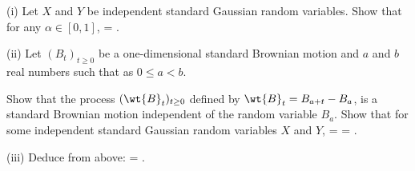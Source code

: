 \begin{problem}
\ben
\item [(i)] Let $X$ and $Y$ be independent standard Gaussian random variables. Show that for any $\alpha \in [0,1]$,
\be
\pro{} = \arcsin\sqrt{\alpha}.
\ee

\item [(ii)] Let $(B_t)_{t\geq 0}$ be a one-dimensional standard Brownian motion and $a$ and $b$ real numbers such that as $0\leq a< b$.

Show that the process $(\wt{B}_t)_{t\geq 0}$ defined by $\wt{B}_t = B_{a+t}-B_a$, is a standard Brownian motion independent of the random variable $B_a$. Show that for some independent standard Gaussian random variables $X$ and $Y$,
\be
\pro{} = \pro{} = \pro{}.
\ee

\item [(iii)] Deduce from above:
\be
\pro{} = \arcsin{}.
\ee
\een
\end{problem}


